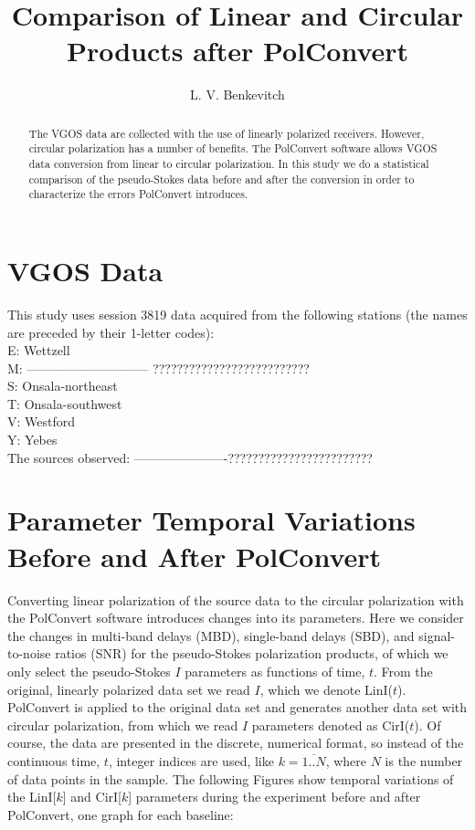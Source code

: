 \documentclass[letterpaper,twoside,12pt]{article}
\title{Comparison of Linear and Circular Products after PolConvert}
\author[1]{L. V. Benkevitch}
\affil[1]{\small MIT Haystack observatory, Westford, MA 01886, USA.}
\begin{document}
\maketitle

\begin{abstract}

The VGOS data are collected with the use of linearly polarized receivers. However, circular polarization has a number of benefits. The PolConvert software allows VGOS data conversion from linear to circular polarization. In this study we do a statistical comparison of the pseudo-Stokes data before and after the conversion in order to characterize the errors PolConvert introduces.

\end{abstract}


\tableofcontents

\section{VGOS Data}

This study uses session 3819 data acquired from the following stations (the names are preceded by their 1-letter codes): \\
\indent E: Wettzell \\
\indent M: ----------------------------- ?????????????????????????? \\
\indent S: Onsala-northeast \\
\indent T: Onsala-southwest \\
\indent V: Westford \\
\indent Y: Yebes \\

The sources observed: ----------------------???????????????????????? \\



\section{Parameter Temporal Variations Before and After PolConvert}

Converting linear polarization of the source data to the circular polarization with the PolConvert software introduces changes into its parameters. Here we consider the changes in multi-band delays (MBD), single-band delays (SBD), and signal-to-noise ratios (SNR) for the pseudo-Stokes polarization products, of which we only select the pseudo-Stokes $I$ parameters as functions of time, $t$. From the original, linearly polarized data set we read $I$, which we denote LinI($t$). PolConvert is applied to the original data set and generates another data set with circular polarization, from which we read $I$ parameters denoted as CirI($t$). Of course, the data are presented in the discrete, numerical format, so instead of the continuous time, $t$, integer indices are used, like $k=\overline{1..N}$, where $N$ is the number of data points in the sample.  The following Figures show temporal variations of the LinI[$k$] and CirI[$k$] parameters during the experiment before and after PolConvert, one graph for each baseline:  \\
\end{document}
